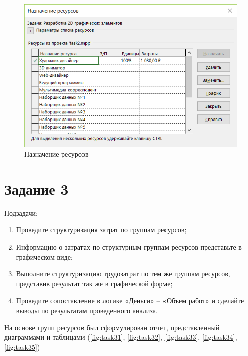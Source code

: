 \begin{figure}[H]
	\centering
	\includegraphics[width=0.7\linewidth]{src/task2_1}
	\caption{Назначение ресурсов}
	\label{fig:task21}
\end{figure}

\section{Задание 3}
Подзадачи:
\begin{enumerate}
	\item Проведите структуризация затрат по группам ресурсов;
	\item Информацию о затратах по структурным группам ресурсов представьте в
	графическом виде;
	\item Выполните структуризацию трудозатрат по тем же группам ресурсов,
	представив результат так же в графической форме;
	\item Проведите сопоставление в логике «Деньги» – «Объем работ» и сделайте
	выводы по результатам проведенного анализа.
\end{enumerate}

На основе групп ресурсов был сформулирован отчет, представленный диаграммами и таблицами (\ref{fig:task31}, \ref{fig:task32}, \ref{fig:task33}, \ref{fig:task34},
\ref{fig:task35})


